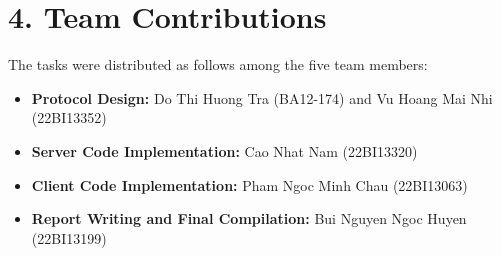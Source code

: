 \documentclass[a4paper,12pt]{article}
\begin{document}
\section*{4. Team Contributions}
The tasks were distributed as follows among the five team members:
\begin{itemize}
    \item \textbf{Protocol Design:} Do Thi Huong Tra (BA12-174) and Vu Hoang Mai Nhi (22BI13352)
    \item \textbf{Server Code Implementation:} Cao Nhat Nam (22BI13320)
    \item \textbf{Client Code Implementation:} Pham Ngoc Minh Chau (22BI13063)
    \item \textbf{Report Writing and Final Compilation:} Bui Nguyen Ngoc Huyen (22BI13199)
\end{itemize}
\end{document}
